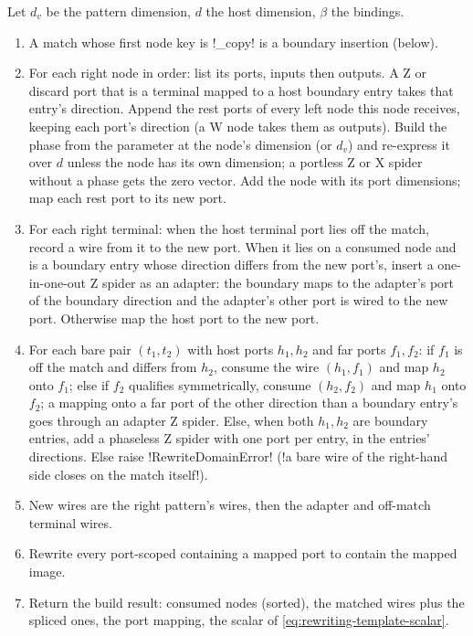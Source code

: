 \begin{algorithm}\label{alg:rewriting-rebuild}
Let $d_v$ be the pattern dimension, $d$ the host dimension, $\beta$ the bindings.
\begin{enumerate}
\item A match whose first node key is \code!_copy! is a boundary insertion (below).
\item For each right node in order: list its ports, inputs then outputs. A Z or discard port that
  is a terminal mapped to a host boundary entry takes that entry's direction. Append the rest ports
  of every left node this node receives, keeping each port's direction (a W node takes them as
  outputs). Build the phase from the parameter at the node's dimension (or $d_v$) and re-express it
  over $d$ unless the node has its own dimension; a portless Z or X spider without a phase gets the
  zero vector. Add the node with its port dimensions; map each rest port to its new port.
\item For each right terminal: when the host terminal port lies off the match, record a wire from
  it to the new port. When it lies on a consumed node and is a boundary entry whose direction
  differs from the new port's, insert a one-in-one-out Z spider as an adapter: the boundary maps to
  the adapter's port of the boundary direction and the adapter's other port is wired to the new
  port. Otherwise map the host port to the new port.
\item For each bare pair $(t_1, t_2)$ with host ports $h_1, h_2$ and far ports $f_1, f_2$:
  if $f_1$ is off the match and differs from $h_2$, consume the wire $(h_1,f_1)$ and map $h_2$ onto
  $f_1$; else if $f_2$ qualifies symmetrically, consume $(h_2, f_2)$ and map $h_1$ onto $f_2$; a
  mapping onto a far port of the other direction than a boundary entry's goes through an adapter
  Z spider. Else, when both $h_1, h_2$ are boundary entries, add a phaseless Z spider with one port
  per entry, in the entries' directions. Else raise \py!RewriteDomainError!
  (\code!a bare wire of the right-hand side closes on the match itself!).
\item New wires are the right pattern's wires, then the adapter and off-match terminal wires.
\item Rewrite every port-scoped \bbox{} containing a mapped port to contain the mapped image.
\item Return the build result: consumed nodes (sorted), the matched wires plus the spliced ones,
  the port mapping, the scalar of \cref{eq:rewriting-template-scalar}.
\end{enumerate}
\end{algorithm}


